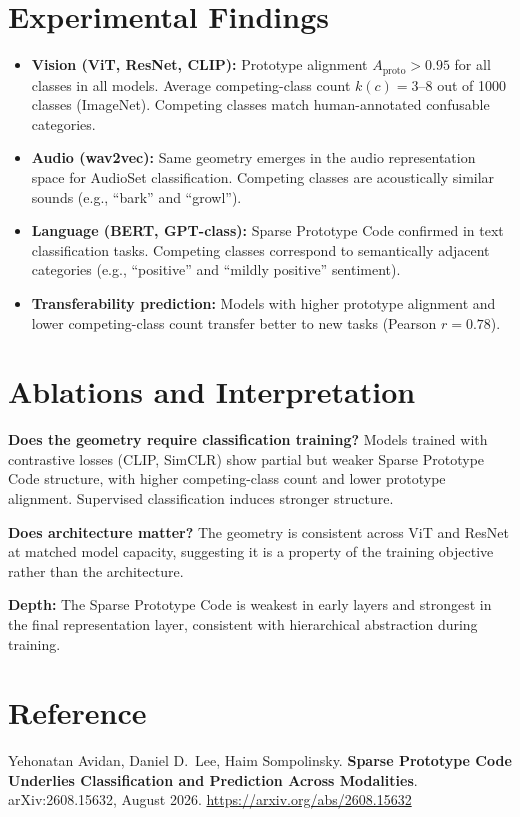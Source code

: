 \documentclass[10pt,twocolumn]{article}
\begin{document}
\section{Experimental Findings}

\begin{itemize}[itemsep=2pt,parsep=0pt]
  \item \textbf{Vision (ViT, ResNet, CLIP):} Prototype alignment $A_{\text{proto}} > 0.95$
    for all classes in all models. Average competing-class count $k(c) = 3$--$8$
    out of 1000 classes (ImageNet). Competing classes match human-annotated
    confusable categories.
  \item \textbf{Audio (wav2vec):} Same geometry emerges in the audio representation
    space for AudioSet classification. Competing classes are acoustically similar
    sounds (e.g., ``bark'' and ``growl'').
  \item \textbf{Language (BERT, GPT-class):} Sparse Prototype Code confirmed in
    text classification tasks. Competing classes correspond to semantically
    adjacent categories (e.g., ``positive'' and ``mildly positive'' sentiment).
  \item \textbf{Transferability prediction:} Models with higher prototype alignment
    and lower competing-class count transfer better to new tasks (Pearson $r = 0.78$).
\end{itemize}

\section{Ablations and Interpretation}

\textbf{Does the geometry require classification training?} Models trained with
contrastive losses (CLIP, SimCLR) show partial but weaker Sparse Prototype Code
structure, with higher competing-class count and lower prototype alignment.
Supervised classification induces stronger structure.

\textbf{Does architecture matter?} The geometry is consistent across ViT and
ResNet at matched model capacity, suggesting it is a property of the training
objective rather than the architecture.

\textbf{Depth:} The Sparse Prototype Code is weakest in early layers and
strongest in the final representation layer, consistent with hierarchical
abstraction during training.

\section*{Reference}

Yehonatan Avidan, Daniel D.\ Lee, Haim Sompolinsky.
\textbf{Sparse Prototype Code Underlies Classification and Prediction Across Modalities}.
arXiv:2608.15632, August 2026.
\url{https://arxiv.org/abs/2608.15632}
\end{document}
